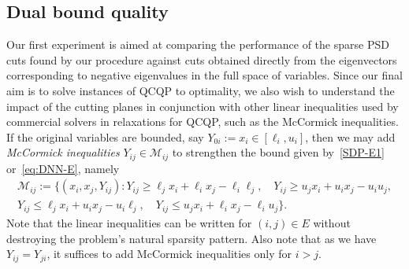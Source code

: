\documentclass[twoside]{article}
\begin{document}
		
		
		\subsection{Dual bound quality}
		\label{sec:bounds}
		
		Our first experiment is aimed at comparing the performance of the sparse PSD cuts found by our procedure against cuts obtained directly from the eigenvectors corresponding to negative eigenvalues in the full space of variables.  Since our final aim is to solve instances of QCQP to optimality, we also wish to understand the impact of the cutting planes in conjunction with other linear inequalities used by commercial solvers in relaxations for QCQP, such as the McCormick inequalities. If the original variables are bounded, say $Y_{0i} := x_i \in [\ell_i,u_i]$, then we may add \emph{McCormick inequalities} $Y_{ij} \in \mathcal{M}_{ij}$ to strengthen the bound given by~\eqref{SDP-E1} or~\eqref{eq:DNN-E}, namely
		\begin{multline}
			\mathcal{M}_{ij}
			:=
			\bigl\{(x_i,x_j,Y_{ij}) :
			Y_{ij} \geq \ell_j x_i + \ell_i x_j-\ell_i\ell_j,\quad
			Y_{ij} \geq u_j x_i + u_i x_j-u_i u_j,\\
			Y_{ij} \leq \ell_j x_i + u_i x_j-u_i\ell_j,\quad
			Y_{ij} \leq u_j x_i + \ell_i x_j-\ell_i u_j
			\bigr\}.
		\end{multline}
		Note that the linear inequalities can be written for $(i,j) \in E$ without destroying the problem's natural sparsity pattern. Also note that as we have $Y_{ij}=Y_{ji}$, it suffices to add McCormick inequalities only for $i>j$.
		
		
\end{document}
